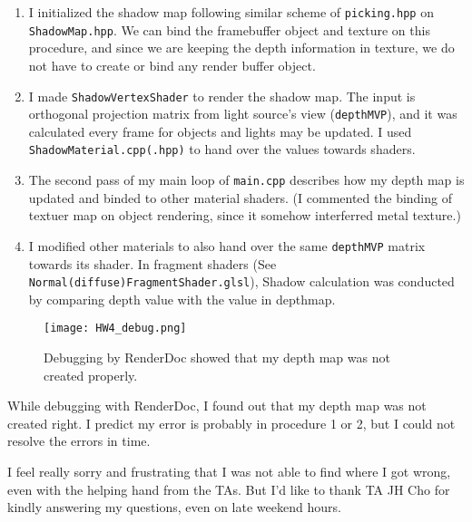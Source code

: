 \documentclass[10pt,a4paper]{article}
\begin{document}
	\begin{enumerate}
		
		\item I initialized the shadow map following similar scheme of \texttt{picking.hpp} on \texttt{ShadowMap.hpp}. We can bind the framebuffer object and texture on this procedure, and since we are keeping the depth information in texture, we do not have to create or bind any render buffer object.
		
		\item I made \texttt{ShadowVertexShader} to render the shadow map. The input is orthogonal projection matrix from light source's view (\texttt{depthMVP}), and it was calculated every frame for objects and lights may be updated. I used \texttt{ShadowMaterial.cpp(.hpp)} to hand over the values towards shaders.
		
		\item The second pass of my main loop of \texttt{main.cpp} describes how my depth map is updated and binded to other material shaders. (I commented the binding of textuer map on object rendering, since it somehow interferred metal texture.)
		
		\item I modified other materials to also hand over the same \texttt{depthMVP} matrix towards its shader. In fragment shaders (See \texttt{Normal(diffuse)FragmentShader.glsl}), Shadow calculation was conducted by comparing depth value with the value in depthmap. 		
	\end{enumerate}
	\begin{figure}[h]
		\centering
		\texttt{[image: HW4\_debug.png]}
		\caption{Debugging by RenderDoc showed that my depth map was not created properly.}
		\label{fig:metal}
	\end{figure}
	While debugging with RenderDoc, I found out that my depth map was not created right. I predict my error is probably in procedure 1 or 2, but I could not resolve the errors in time.
	
	I feel really sorry and frustrating that I was not able to find where I got wrong, even with the helping hand from the TAs. But I'd like to thank TA JH Cho for kindly answering my questions, even on late weekend hours. 
	 
\end{document}
